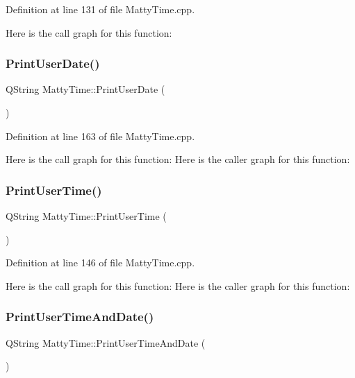 Definition at line 131 of file Matty\+Time.\+cpp.

Here is the call graph for this function\+:
\hypertarget{classMattyTime_a646278576993d7ed05af67aee6ac96cb}{}\label{classMattyTime_a646278576993d7ed05af67aee6ac96cb} 
\subsubsection{\texorpdfstring{Print\+User\+Date()}{PrintUserDate()}}
{\footnotesize\ttfamily Q\+String Matty\+Time\+::\+Print\+User\+Date (\begin{DoxyParamCaption}{ }\end{DoxyParamCaption})}



Definition at line 163 of file Matty\+Time.\+cpp.

Here is the call graph for this function\+:
Here is the caller graph for this function\+:
\hypertarget{classMattyTime_a9cbf666ccbe45a8ca45f9ffc42d5102c}{}\label{classMattyTime_a9cbf666ccbe45a8ca45f9ffc42d5102c} 
\subsubsection{\texorpdfstring{Print\+User\+Time()}{PrintUserTime()}}
{\footnotesize\ttfamily Q\+String Matty\+Time\+::\+Print\+User\+Time (\begin{DoxyParamCaption}{ }\end{DoxyParamCaption})}



Definition at line 146 of file Matty\+Time.\+cpp.

Here is the call graph for this function\+:
Here is the caller graph for this function\+:
\hypertarget{classMattyTime_afa30c1dd3bae1e8f50e816803f39d1c4}{}\label{classMattyTime_afa30c1dd3bae1e8f50e816803f39d1c4} 
\subsubsection{\texorpdfstring{Print\+User\+Time\+And\+Date()}{PrintUserTimeAndDate()}}
{\footnotesize\ttfamily Q\+String Matty\+Time\+::\+Print\+User\+Time\+And\+Date (\begin{DoxyParamCaption}{ }\end{DoxyParamCaption})}



